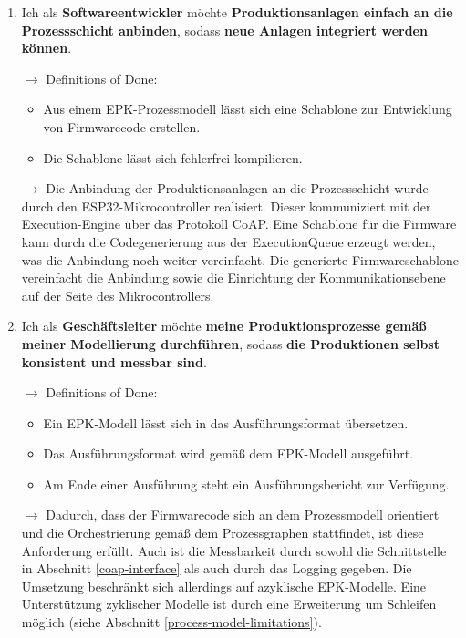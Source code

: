 \begin{enumerate}
    \item Ich als \textbf{Softwareentwickler} möchte \textbf{Produktionsanlagen einfach an die Prozessschicht anbinden},
    sodass \textbf{neue Anlagen integriert werden können}.

    $\to$ Definitions of Done:

    \begin{itemize}
        \item Aus einem EPK-Prozessmodell lässt sich eine Schablone zur Entwicklung von Firmwarecode erstellen.
        \item Die Schablone lässt sich fehlerfrei kompilieren.
    \end{itemize}

    $\to$ Die Anbindung der Produktionsanlagen an die Prozessschicht wurde durch den ESP32-Mikrocontroller realisiert.
    Dieser kommuniziert mit der Execution-Engine über das Protokoll CoAP. Eine Schablone für die Firmware kann durch die 
    Codegenerierung aus der ExecutionQueue erzeugt werden, was die Anbindung noch weiter vereinfacht. Die generierte Firmwareschablone
    vereinfacht die Anbindung sowie die Einrichtung der Kommunikationsebene auf der Seite des Mikrocontrollers.

    \item Ich als \textbf{Geschäftsleiter} möchte \textbf{meine Produktionsprozesse gemäß meiner Modellierung durchführen},
    sodass \textbf{die Produktionen selbst konsistent und messbar sind}.

    $\to$ Definitions of Done:

    \begin{itemize}
        \item Ein EPK-Modell lässt sich in das Ausführungsformat übersetzen.
        \item Das Ausführungsformat wird gemäß dem EPK-Modell ausgeführt.
        \item Am Ende einer Ausführung steht ein Ausführungsbericht zur Verfügung.
    \end{itemize}

    $\to$ Dadurch, dass der Firmwarecode sich an dem Prozessmodell orientiert und die Orchestrierung gemäß dem Prozessgraphen 
    stattfindet, ist diese Anforderung erfüllt. Auch ist die Messbarkeit durch sowohl die Schnittstelle in Abschnitt \ref{coap-interface} 
    als auch durch das Logging gegeben. Die Umsetzung beschränkt sich allerdings auf azyklische EPK-Modelle.
    Eine Unterstützung zyklischer Modelle ist durch eine Erweiterung um Schleifen möglich (siehe Abschnitt \ref{process-model-limitations}).


\end{enumerate}

